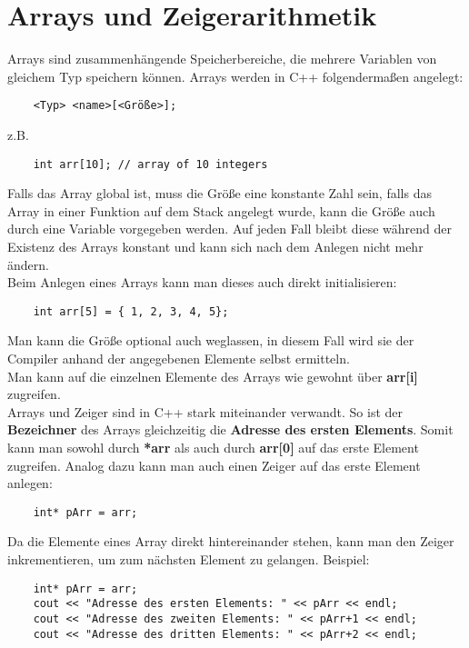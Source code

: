 \documentclass[
  accentcolor=tud1c,	%
  colorbacktitle,		%
  inverttitle,			%
  german,				%
  twoside
]{tudexercise}
\begin{document}
\section{Arrays und Zeigerarithmetik}
Arrays sind zusammenhängende Speicherbereiche, die mehrere Variablen von gleichem Typ speichern können. Arrays werden in C++ folgendermaßen angelegt:

\begin{lstlisting}
	<Typ> <name>[<Größe>];
\end{lstlisting}

z.B.
\begin{lstlisting}
	int arr[10]; // array of 10 integers
\end{lstlisting}

Falls das Array global ist, muss die Größe eine konstante Zahl sein, falls das Array in einer Funktion auf dem Stack angelegt wurde, kann die Größe auch durch eine Variable vorgegeben werden. Auf jeden Fall bleibt diese während der Existenz des Arrays konstant und kann sich nach dem Anlegen nicht mehr ändern.\\
Beim Anlegen eines Arrays kann man dieses auch direkt initialisieren:
\begin{lstlisting}
	int arr[5] = { 1, 2, 3, 4, 5};
\end{lstlisting}
Man kann die Größe optional auch weglassen, in diesem Fall wird sie der Compiler anhand der angegebenen Elemente selbst ermitteln. \\

Man kann auf die einzelnen Elemente des Arrays wie gewohnt über 
\textbf{arr[i]}
zugreifen. \\

Arrays und Zeiger sind in C++ stark miteinander verwandt. So ist der \textbf{Bezeichner} des Arrays gleichzeitig die \textbf{Adresse des ersten Elements}. Somit kann man sowohl durch \textbf{*arr} als auch durch \textbf{arr[0]} auf das erste Element zugreifen.
Analog dazu kann man auch einen Zeiger auf das erste Element anlegen:
\begin{lstlisting}
	int* pArr = arr;
\end{lstlisting}
Da die Elemente eines Array direkt hintereinander stehen, kann man den Zeiger inkrementieren, um zum  nächsten Element zu gelangen. Beispiel:

\begin{lstlisting}
	int* pArr = arr;
	cout << "Adresse des ersten Elements: " << pArr << endl;
	cout << "Adresse des zweiten Elements: " << pArr+1 << endl;
	cout << "Adresse des dritten Elements: " << pArr+2 << endl;
\end{lstlisting}
\end{document}
